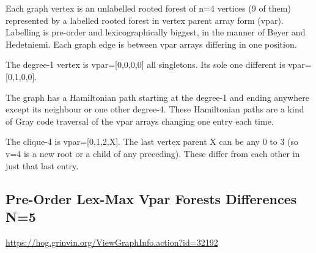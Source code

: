 \documentclass{article}
\begin{document}
Each graph vertex is an unlabelled rooted forest of n=4 vertices (9 of
them) represented by a labelled rooted forest in vertex parent array
form (vpar).  Labelling is pre-order and lexicographically biggest, in
the manner of Beyer and Hedetniemi.  Each graph edge is between vpar
arrays differing in one position.

The degree-1 vertex is vpar=[0,0,0,0] all singletons.  Its sole one
different is vpar=[0,1,0,0].

The graph has a Hamiltonian path starting at the degree-1 and ending
anywhere except its neighbour or one other degree-4.  These
Hamiltonian paths are a kind of Gray code traversal of the vpar arrays
changing one entry each time.

The clique-4 is vpar=[0,1,2,X].  The last vertex parent X can be any 0
to 3 (so v=4 is a new root or a child of any preceding).  These differ
from each other in just that last entry.

\begin{center}
\end{center}

\subsection{Pre-Order Lex-Max Vpar Forests Differences N=5}

\url{https://hog.grinvin.org/ViewGraphInfo.action?id=32192}
\end{document}
